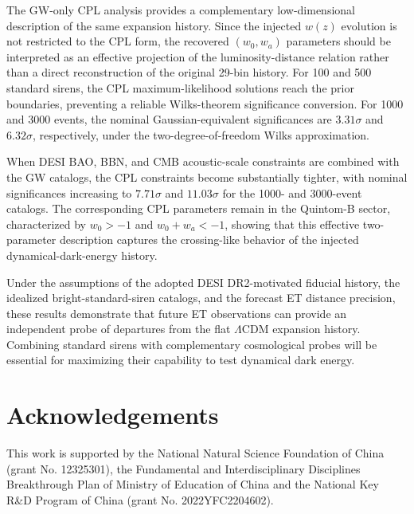 \documentclass[
  aps,
  prd,
  twocolumn,
  nofootinbib,
  superscriptaddress,
  floatfix,
  longbibliography
]{revtex4-2}
\newcommand{\LCDM}{\ensuremath{\Lambda\mathrm{CDM}}}
\begin{document}
The GW-only CPL analysis provides a complementary low-dimensional
description of the same expansion history. Since the injected $w(z)$
evolution is not restricted to the CPL form, the recovered
$(w_0,w_a)$ parameters should be interpreted as an effective projection of
the luminosity-distance relation rather than a direct reconstruction of
the original 29-bin history. For 100 and 500 standard sirens, the CPL
maximum-likelihood solutions reach the prior boundaries, preventing a
reliable Wilks-theorem significance conversion. For 1000 and 3000 events,
the nominal Gaussian-equivalent significances are
$3.31\sigma$ and $6.32\sigma$, respectively, under the two-degree-of-freedom
Wilks approximation.

When DESI BAO, BBN, and CMB acoustic-scale constraints are combined with
the GW catalogs, the CPL constraints become substantially tighter, with
nominal significances increasing to $7.71\sigma$ and $11.03\sigma$ for
the 1000- and 3000-event catalogs. The corresponding CPL parameters remain
in the Quintom-B sector, characterized by $w_0>-1$ and
$w_0+w_a<-1$, showing that this effective two-parameter description
captures the crossing-like behavior of the injected dynamical-dark-energy
history.

Under the assumptions of the adopted DESI DR2-motivated fiducial history,
the idealized bright-standard-siren catalogs, and the forecast ET distance
precision, these results demonstrate that future ET observations can
provide an independent probe of departures from the flat $\LCDM$ expansion
history. Combining standard sirens with complementary cosmological probes
will be essential for maximizing their capability to test dynamical dark
energy.




\section*{Acknowledgements}

This work is supported by the National Natural Science Foundation of China (grant No. 12325301), the Fundamental and Interdisciplinary Disciplines Breakthrough Plan of Ministry of Education of China and the National Key R\&D Program of China
(grant No. 2022YFC2204602).


\end{document}
